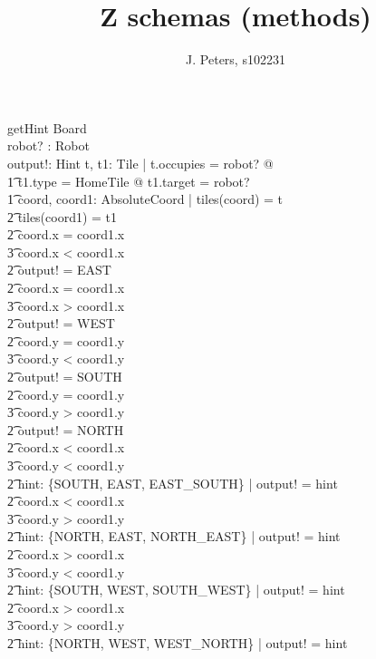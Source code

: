 \documentclass[a4paper,11pt]{article}
\begin{document}
\title{Z schemas (methods)}
\author{J. Peters, s102231}
\maketitle

\begin{schema}{getHint}
\Delta Board \\
robot? : Robot \\
output!: Hint
\where
\exists t, t1: Tile | t.occupies = robot? @\\ \t1
t1.type = HomeTile @ t1.target = robot? \\ \t1
\exists coord, coord1: AbsoluteCoord | tiles(coord) = t \\ \t2
tiles(coord1) = t1 \\ \t2
\IF coord.x = coord1.x \\ \t3
coord.x < coord1.x \\ \t2
\THEN output! = EAST \\ \t2
\IF coord.x = coord1.x \\ \t3
coord.x > coord1.x \\ \t2
\THEN output! = WEST \\ \t2
\IF coord.y = coord1.y \\ \t3
coord.y < coord1.y \\ \t2
\THEN output! = SOUTH \\ \t2
\IF coord.y = coord1.y \\ \t3
coord.y > coord1.y \\ \t2
\THEN output! = NORTH \\ \t2
\IF coord.x < coord1.x \\ \t3
coord.y < coord1.y \\ \t2
\THEN \exists hint: \{SOUTH, EAST, EAST\_SOUTH\} | output! = hint \\ \t2
\IF coord.x < coord1.x \\ \t3
coord.y > coord1.y \\ \t2
\THEN \exists hint: \{NORTH, EAST, NORTH\_EAST\} | output! = hint \\ \t2
\IF coord.x > coord1.x \\ \t3
coord.y < coord1.y \\ \t2
\THEN \exists hint: \{SOUTH, WEST, SOUTH\_WEST\} | output! = hint \\ \t2
\IF coord.x > coord1.x \\ \t3
coord.y > coord1.y \\ \t2
\THEN \exists hint: \{NORTH, WEST, WEST\_NORTH\} | output! = hint
\end{schema}
\end{document}
